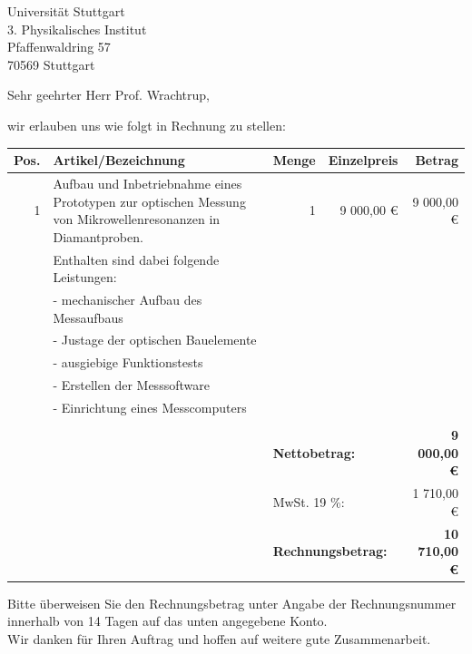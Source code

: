 \documentclass[DIN,
               paper=a4,
               fontsize=11pt,
               addrfield=on,
               enlargefirstpage=on,
               foldmarks=on,
               pagenumber=off,
               firsthead=on,
               firstfoot=on,
               parskip=full,
               addrfield=on,
               fromalign=right,
               fromemail=true,
               fromphone=true,
               fromurl=true,
               fromlogo=on,
               fromrule=off,
               numericaldate=off,
              ]{scrlttr2}
\begin{document}
\begin{letter}{Universität Stuttgart\\
               3. Physikalisches Institut\\             
               Pfaffenwaldring 57\\
               70569 Stuttgart}
\opening{Sehr geehrter Herr Prof. Wrachtrup,}
wir erlauben uns wie folgt in Rechnung zu stellen:

\begin{tabular}{rp{7.5cm}rrr}
  \toprule
  \textbf{Pos.}&\textbf{Artikel/Bezeichnung}&\textbf{Menge}&\textbf{Einzelpreis}&\textbf{Betrag}\\
  \toprule
  1 & Aufbau und Inbetriebnahme eines Prototypen zur optischen Messung
	    von Mikrowellenresonanzen in Diamantproben. & 1 & 9 000,00 € & 9 000,00 € \\
	  & Enthalten sind dabei folgende Leistungen: & & & \\
	  & - mechanischer Aufbau des Messaufbaus & & & \\
	  & - Justage der optischen Bauelemente & & & \\
	  & - ausgiebige Funktionstests & & & \\
	  & - Erstellen der Messsoftware & & & \\
	  & - Einrichtung eines Messcomputers & & & \\
  \bottomrule
	  & & & & \\
	  & & \multicolumn{2}{l}{\textbf{Nettobetrag:}} & \textbf{9 000,00 €}\\
	  & & \multicolumn{2}{l}{MwSt. 19 \%:} & 1 710,00 €\\
	  & & \multicolumn{2}{l}{\textbf{Rechnungsbetrag:}} & \textbf{10 710,00 €}\\
\end{tabular}

Bitte überweisen Sie den Rechnungsbetrag unter Angabe der Rechnungsnummer innerhalb von 14 Tagen auf das unten angegebene Konto.\\

Wir danken für Ihren Auftrag und hoffen auf weitere gute Zusammenarbeit.\\



\end{letter}
\end{document}
